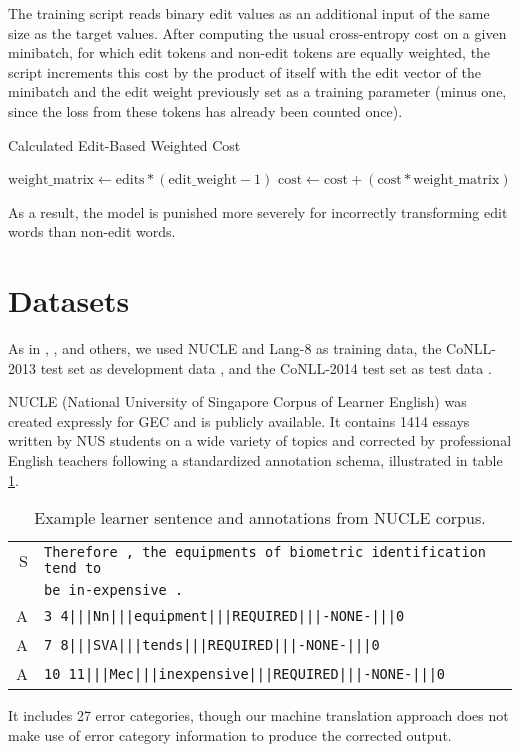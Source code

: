 The training script reads binary edit values as an additional input of the same size as the target values. After computing the usual cross-entropy cost on a given minibatch, for which edit tokens and non-edit tokens are equally weighted, the script increments this cost by the product of itself with the edit vector of the minibatch and the edit weight previously set as a training parameter (minus one, since the loss from these tokens has already been counted once).
\begin{algorithm}
\caption{Calculated Edit-Based Weighted Cost}
\label{alg:increment-cost}
\begin{algorithmic}[1]
\State $\text{weight\_matrix} \gets \text{edits} * (\text{edit\_weight} - 1)$
\State $\text{cost} \gets \text{cost} + (\text{cost} * \text{weight\_matrix})$
\EndProcedure
\end{algorithmic}
\end{algorithm}
As a result, the model is punished more severely for incorrectly transforming edit words than non-edit words.

\section{Datasets} \label{sec:datasets}
As in \citet{Susanto2014SystemCorrection}, \citet{Chollampatt2016NeuralCorrection}, and others, we used NUCLE \citep{Dahlmeier2013BuildingEnglish} and Lang-8 \citep{Mizumoto2011MiningLearners,Tajiri2012TenseContext} as training data, the CoNLL-2013 test set as development data \citep{Ng2013TheCorrection}, and the CoNLL-2014 test set as test data \citep{Ng2014TheCorrection}.

NUCLE (National University of Singapore Corpus of Learner English) was created expressly for GEC and is publicly available. It contains 1414 essays written by NUS students on a wide variety of topics and corrected by professional English teachers following a standardized annotation schema, illustrated in table \ref{tab:training-nucle}.
\begin{table}[h]
\centering
\begin{tabular}{r l}
\tabularnewline \hline \hline
S & \texttt{Therefore , the equipments of biometric identification tend to} \\
& \texttt{be in-expensive .} \\
A & \texttt{3 4|||Nn|||equipment|||REQUIRED|||-NONE-|||0} \\
A & \texttt{7 8|||SVA|||tends|||REQUIRED|||-NONE-|||0} \\
A & \texttt{10 11|||Mec|||inexpensive|||REQUIRED|||-NONE-|||0} \\
\hline
\end{tabular}
\caption{Example learner sentence and annotations from NUCLE corpus.}
\label{tab:training-nucle}
\end{table}
It includes 27 error categories, though our machine translation approach does not make use of error category information to produce the corrected output.

